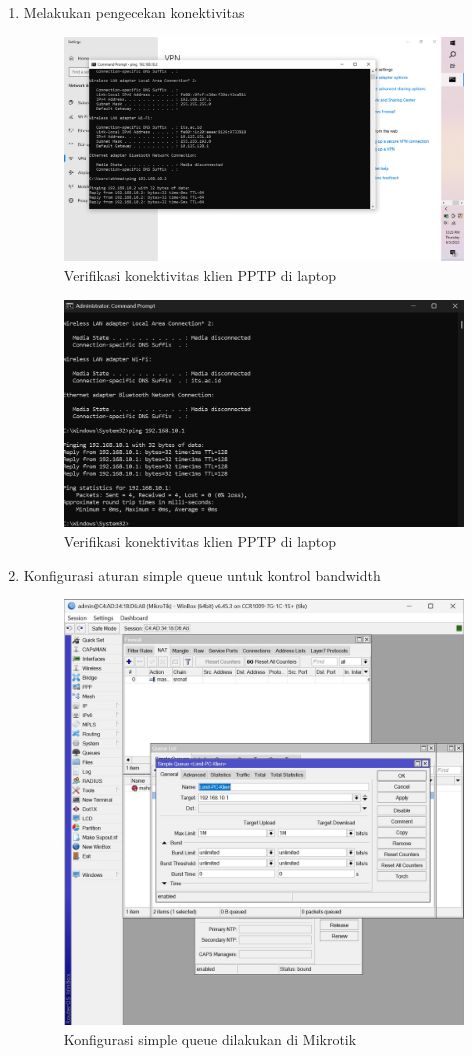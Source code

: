 \begin{enumerate}
    \item Melakukan pengecekan konektivitas 
    \begin{figure}[H]
        \centering
        \includegraphics[width=0.5\linewidth]{P1/img/gambar10.jpeg}
        \caption{Verifikasi konektivitas klien PPTP di laptop}
        \label{fig:Verifikasi-koneksi-laptop}
    \end{figure}

    \begin{figure}[H]
        \centering
        \includegraphics[width=0.5\linewidth]{P1/img/gambar10b.jpeg}
        \caption{Verifikasi konektivitas klien PPTP di laptop}
        \label{fig:Verifikasi-koneksi-laptop}
    \end{figure}


    \item Konfigurasi aturan simple queue untuk kontrol bandwidth
    \begin{figure}[H]
        \centering
        \includegraphics[width=0.5\linewidth]{P1/img/gambar11.jpeg}
        \caption{Konfigurasi simple queue dilakukan di Mikrotik}
        \label{fig:Simple-queue-mikrotik}
    \end{figure}
    

\end{enumerate}
